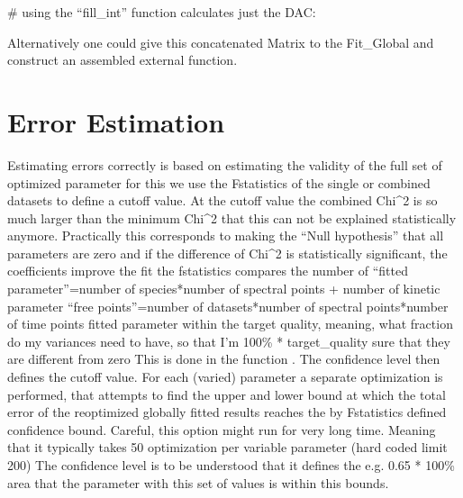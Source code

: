 \documentclass[letterpaper,10pt,english]{sphinxmanual}
\begin{document}
\# using the “fill\_int” function calculates just the DAC:

\begin{sphinxVerbatim}[commandchars=\\\{\}]
\end{sphinxVerbatim}

Alternatively one could give this concatenated Matrix to the Fit\_Global and construct
an assembled external function.


\section{Error Estimation}
\label{\detokenize{Fitting:error-estimation}}
Estimating errors correctly is based on estimating the validity of the full set of optimized parameter for this we use the F\sphinxhyphen{}statistics of the single or combined datasets to define a cutoff value. At the cutoff value the combined Chi\textasciicircum{}2 is so much larger than the minimum Chi\textasciicircum{}2 that this can not be explained statistically anymore. Practically this corresponds to making the “Null hypothesis” that all parameters are zero and if the difference of Chi\textasciicircum{}2 is statistically significant, the coefficients improve the fit
the f\sphinxhyphen{}statistics compares the number of
“fitted parameter”=number of species*number of spectral points + number of kinetic parameter
“free points”=number of datasets*number of spectral points*number of time points \sphinxhyphen{} fitted parameter
within the target quality, meaning, what fraction do my variances need to have, so that I’m 100\% * target\_quality sure that they are different from zero
This is done in the function {\hyperref[\detokenize{plot_func:plot_func.s2_vs_smin2}]{}}. The confidence level then defines the cutoff value. For each (varied) parameter a separate optimization is performed, that attempts to find the upper and lower bound at which the total error of the re\sphinxhyphen{}optimized globally fitted results reaches the by F\sphinxhyphen{}statistics defined confidence bound. Careful, this option might run for very long time. Meaning that it typically takes 50 optimization per variable parameter (hard coded limit 200) The confidence level is to be understood that it defines the e.g. 0.65 * 100\% area that the parameter with this set of values is within this bounds.
\end{document}

